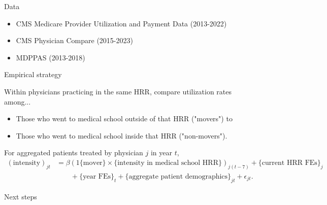 \documentclass[10pt,aspectratio=169]{beamer}
\begin{document}
\begin{frame}{Data} 
    \begin{itemize}
        \item CMS Medicare Provider Utilization and Payment Data (2013-2022)
        \item CMS Physician Compare (2015-2023)
        \item MDPPAS (2013-2018)
    \end{itemize}
\end{frame}



\begin{frame}{Empirical strategy}

    Within physicians practicing in the same HRR, compare utilization rates among...
        \begin{itemize}
            \item Those who went to medical school outside of that HRR ("movers") to
            \item Those who went to medical school inside that HRR ("non-movers").
        \end{itemize}

    \vspace{5mm}
    For aggregated patients treated by physician $j$ in year $t$,  
        \begin{align*}
            (\text{intensity})_{jt} 
            &= \beta (1\{\text{mover}\} \times \{\text{intensity in medical school HRR}\})_{j(t-7)} + \{\text{current HRR FEs}\}_j \\
            &\qquad + \{\text{year FEs}\}_t + \{\text{aggregate patient demographics}\}_{jt} + \epsilon_{jt}.
        \end{align*}
    
\end{frame}


\begin{frame}{Next steps}
    
\end{frame}

\appendix
\end{document}
